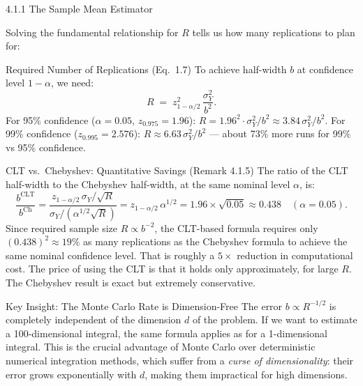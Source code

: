 \documentclass[aspectratio=169,10pt]{beamer}
\begin{document}
\begin{frame}[allowframebreaks]{4.1.1 The Sample Mean Estimator}
\framebreak

Solving the fundamental relationship for $R$ tells us how many
replications to plan for:

\begin{block}{Required Number of Replications (Eq.\ 1.7)}
  To achieve half-width $b$ at confidence level $1 - \alpha$, we need:
  \[
    R \;=\; z_{1-\alpha/2}^2\,\frac{\sigma_Y^2}{b^2}.
    \tag{1.7}
  \]
  For 95\% confidence ($\alpha = 0.05$, $z_{0.975} = 1.96$):
  $R = 1.96^2 \cdot \sigma_Y^2 / b^2 \approx 3.84\,\sigma_Y^2/b^2$.
  For 99\% confidence ($z_{0.995} = 2.576$):
  $R \approx 6.63\,\sigma_Y^2/b^2$ --- about 73\% more runs for 99\%
  vs 95\% confidence.
\end{block}

\begin{exampleblock}{CLT vs.\ Chebyshev: Quantitative Savings (Remark 4.1.5)}
  The ratio of the CLT half-width to the Chebyshev half-width, at the
  same nominal level $\alpha$, is:
  \[
    \frac{b^{\mathrm{CLT}}}{b^{\mathrm{Ch}}}
      = \frac{z_{1-\alpha/2}\,\sigma_Y/\sqrt{R}}{\sigma_Y/(\alpha^{1/2}\sqrt{R})}
      = z_{1-\alpha/2}\,\alpha^{1/2}
      = 1.96 \times \sqrt{0.05}
      \approx 0.438 \quad (\alpha = 0.05).
  \]
  Since required sample size $R \propto b^{-2}$, the CLT-based formula
  requires only $(0.438)^2 \approx 19\%$ as many replications as the
  Chebyshev formula to achieve the same nominal confidence level.  That
  is roughly a $5\times$ reduction in computational cost.  The price of
  using the CLT is that it holds only approximately, for large $R$.
  The Chebyshev result is exact but extremely conservative.
\end{exampleblock}

\begin{alertblock}{Key Insight: The Monte Carlo Rate is Dimension-Free}
  The error $b \propto R^{-1/2}$ is completely independent of the
  dimension $d$ of the problem.  If we want to estimate a
  100-dimensional integral, the same formula applies as for a
  1-dimensional integral.  This is the crucial advantage of Monte
  Carlo over deterministic numerical integration methods, which suffer
  from a \emph{curse of dimensionality}: their error grows
  exponentially with $d$, making them impractical for high dimensions.
\end{alertblock}

\end{frame}
\end{document}
